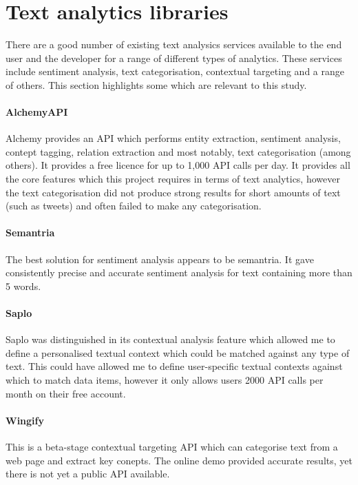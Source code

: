 \section{Text analytics libraries}

There are a good number of existing text analysics services available to the end user and the developer for a range of different types of analytics. These services include sentiment analysis, text categorisation, contextual targeting and a range of others. This section highlights some which are relevant to this study.

\paragraph{AlchemyAPI}
Alchemy provides an API which performs entity extraction, sentiment analysis, contept tagging, relation extraction and most notably, text categorisation (among others). It provides a free licence for up to 1,000 API calls per day. It provides all the core features which this project requires in terms of text analytics, however the text categorisation did not produce strong results for short amounts of text (such as tweets) and often failed to make any categorisation.

\paragraph{Semantria}
The best solution for sentiment analysis appears to be semantria. It gave consistently precise and accurate sentiment analysis for text containing more than 5 words. 

\paragraph{Saplo}
Saplo was distinguished in its contextual analysis feature which allowed me to define a personalised textual context which could be matched against any type of text. This could have allowed me to define user-specific textual contexts against which to match data items, however it only allows users 2000 API calls per month on their free account.

\paragraph{Wingify}
This is a beta-stage contextual targeting API which can categorise text from a web page and extract key conepts. The online demo provided accurate results, yet there is not yet a public API available.

